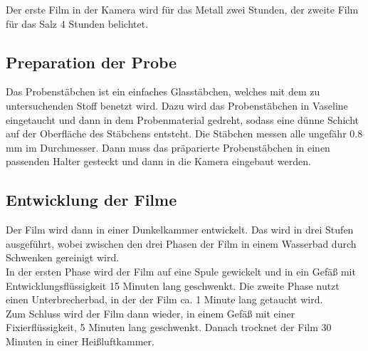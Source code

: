 Der erste Film in der Kamera wird für das Metall zwei Stunden, der zweite Film für das Salz 4 Stunden belichtet. 

\subsection{Preparation der Probe}
Das Probenstäbchen ist ein einfaches Glasstäbchen, welches mit dem zu untersuchenden Stoff benetzt wird.
Dazu wird das Probenstäbchen in Vaseline eingetaucht und dann in dem Probenmaterial gedreht, sodass eine dünne Schicht auf der Oberfläche des Stäbchens entsteht. 
Die Stäbchen messen alle ungefähr 0.8 \si{\milli \meter} im Durchmesser.
Dann muss das präparierte Probenstäbchen in einen passenden Halter gesteckt und dann in die Kamera eingebaut werden.

\subsection{Entwicklung der Filme}
Der Film wird dann in einer Dunkelkammer entwickelt. 
Das wird in drei Stufen ausgeführt, wobei zwischen den drei Phasen der Film in einem Wasserbad durch Schwenken gereinigt wird.\\
In der ersten Phase wird der Film auf eine Spule gewickelt und in ein Gefäß mit Entwicklungsflüssigkeit 15 Minuten lang geschwenkt.
Die zweite Phase nutzt einen Unterbrecherbad, in der der Film ca. 1 Minute lang getaucht wird. \\
Zum Schluss wird der Film dann wieder, in einem Gefäß mit einer Fixierflüssigkeit, 5 Minuten lang geschwenkt.
Danach trocknet der Film 30 Minuten in einer Heißluftkammer.
 







